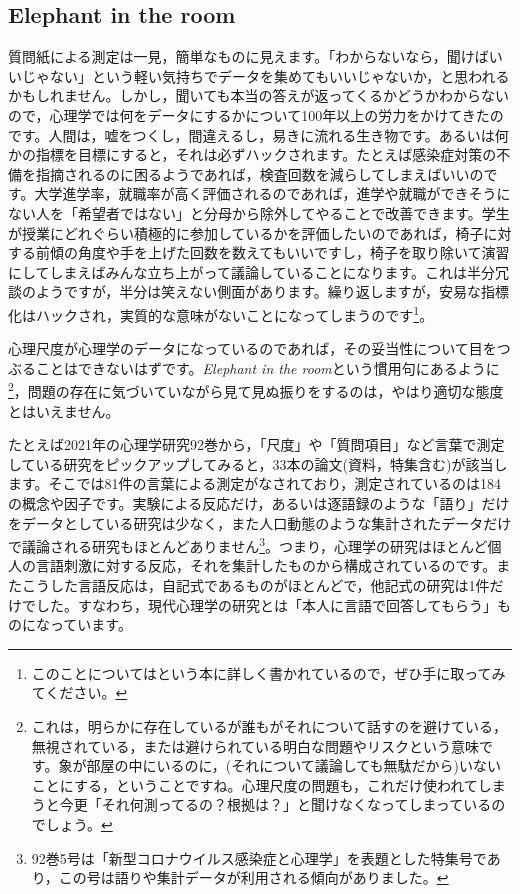 \documentclass{ltjsbook}
\begin{document}
\subsection{Elephant in the room}
質問紙による測定は一見，簡単なものに見えます。「わからないなら，聞けばいいじゃない」という軽い気持ちでデータを集めてもいいじゃないか，と思われるかもしれません。しかし，聞いても本当の答えが返ってくるかどうかわからないので，心理学では何をデータにするかについて100年以上の労力をかけてきたのです。人間は，嘘をつくし，間違えるし，易きに流れる生き物です。あるいは何かの指標を目標にすると，それは必ずハックされます。たとえば感染症対策の不備を指摘されるのに困るようであれば，検査回数を減らしてしまえばいいのです。大学進学率，就職率が高く評価されるのであれば，進学や就職ができそうにない人を「希望者ではない」と分母から除外してやることで改善できます。学生が授業にどれぐらい積極的に参加しているかを評価したいのであれば，椅子に対する前傾の角度や手を上げた回数を数えてもいいですし，椅子を取り除いて演習にしてしまえばみんな立ち上がって議論していることになります。これは半分冗談のようですが，半分は笑えない側面があります。繰り返しますが，安易な指標化はハックされ，実質的な意味がないことになってしまうのです\footnote{このことについては\textcite{Jerry2019}という本に詳しく書かれているので，ぜひ手に取ってみてください。}。

心理尺度が心理学のデータになっているのであれば，その妥当性について目をつぶることはできないはずです。\textit{Elephant in the room}という慣用句にあるように\footnote{これは，明らかに存在しているが誰もがそれについて話すのを避けている，無視されている，または避けられている明白な問題やリスクという意味です。象が部屋の中にいるのに，(それについて議論しても無駄だから)いないことにする，ということですね。心理尺度の問題も，これだけ使われてしまうと今更「それ何測ってるの？根拠は？」と聞けなくなってしまっているのでしょう。}，問題の存在に気づいていながら見て見ぬ振りをするのは，やはり適切な態度とはいえません。

たとえば2021年の心理学研究92巻から，「尺度」や「質問項目」など言葉で測定している研究をピックアップしてみると，33本の論文(資料，特集含む)が該当します。そこでは81件の言葉による測定がなされており，測定されているのは184の概念や因子です。実験による反応だけ，あるいは逐語録のような「語り」だけをデータとしている研究は少なく，また人口動態のような集計されたデータだけで議論される研究もほとんどありません\footnote{92巻5号は「新型コロナウイルス感染症と心理学」を表題とした特集号であり，この号は語りや集計データが利用される傾向がありました。}。つまり，心理学の研究はほとんど個人の言語刺激に対する反応，それを集計したものから構成されているのです。またこうした言語反応は，自記式であるものがほとんどで，他記式の研究は1件\textcite{Nagatani202292}だけでした。すなわち，現代心理学の研究とは「本人に言語で回答してもらう」ものになっています。
\end{document}
